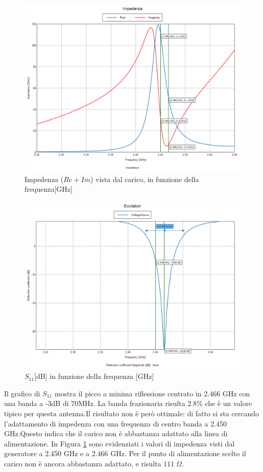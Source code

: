 \documentclass[twoside,twocolumn]{article}
\begin{document}
 \begin{figure}[h!]
  \includegraphics[width=\linewidth]{A_impedenza.png}
  \caption{Impedenza ($Re +Im$) vista dal carico, in funzione della frequenza[GHz]}
  \label{fig:A_impedenza}
\end{figure}
\begin{figure}[h!]
  \includegraphics[width=\linewidth]{A_S11.png}
  \caption{$S_{11} $[dB] in funzione della frequenza [GHz] }
  \label{fig:A_S11}
\end{figure}
Il grafico di $S_{11}$ mostra il picco a minima riflessione centrato in  2.466 GHz con una banda a -3dB di 70MHz. La banda frazionaria risulta 2.8\% che è un valore tipico per questa
antenna.\newline Il risultato non è però ottimale: di fatto si sta cercando l'adattamento di impedenza con una frequenza di centro banda a 2.450 GHz.Questo indica che il carico non è abbastanza adattato alla linea di alimentazione.\newline
In Figura \ref{fig:A_impedenza} sono evidenziati i valori di impedenza visti dal generatore a 2.450 GHz e a 2.466 GHz. Per il punto di alimentazione scelto il carico non è ancora abbastanza adattato, e risulta $111 \;\Omega$.
\end{document}
